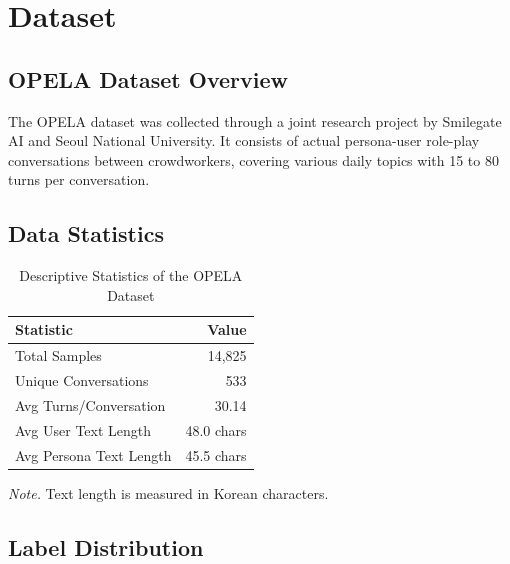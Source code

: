 \documentclass[11pt, a4paper]{article}
\begin{document}
\section{Dataset}

\subsection{OPELA Dataset Overview}

The OPELA dataset was collected through a joint research project by Smilegate AI and Seoul National University. It consists of actual persona-user role-play conversations between crowdworkers, covering various daily topics with 15 to 80 turns per conversation.

\subsection{Data Statistics}

\begin{table}[H]
\centering
\caption{Descriptive Statistics of the OPELA Dataset}
\label{tab:dataset_stats}
\begin{tabular}{lr}
\toprule
\textbf{Statistic} & \textbf{Value} \\
\midrule
Total Samples & 14,825 \\
Unique Conversations & 533 \\
Avg Turns/Conversation & 30.14 \\
Avg User Text Length & 48.0 chars \\
Avg Persona Text Length & 45.5 chars \\
\bottomrule
\end{tabular}

\vspace{0.5em}
\footnotesize\textit{Note.} Text length is measured in Korean characters.
\end{table}

\subsection{Label Distribution}
\end{document}
